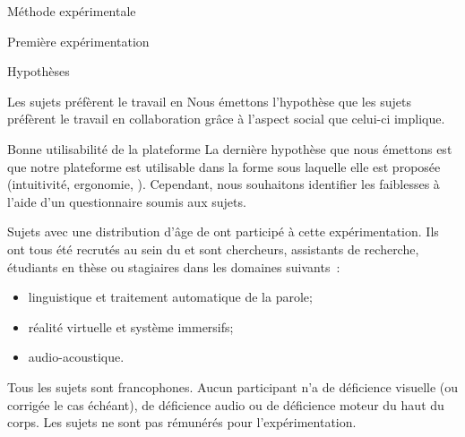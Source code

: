 \documentclass[myfrancais,ngerman,english,french]{mythesis}
\begin{document}
\begin{mychapter}{Méthode expérimentale}
\begin{mysection}{Première expérimentation}
\begin{mysubsection}{Hypothèses}
\begin{myparagraph}{ Les sujets préfèrent le travail en }
					Nous émettons l'hypothèse que les sujets préfèrent le travail en collaboration grâce à l'aspect social que celui-ci implique.
				\end{myparagraph}
				\begin{myparagraph}{ Bonne utilisabilité de la plateforme}
					La dernière hypothèse que nous émettons est que notre plateforme est utilisable dans la forme sous laquelle elle est proposée (intuitivité, ergonomie, \myetc).
					Cependant, nous souhaitons identifier les faiblesses à l'aide d'un questionnaire soumis aux sujets.
				\end{myparagraph}
			\end{mysubsection}
			\begin{mysubsection}{Sujets}
				 avec une distribution d'âge de  ont participé à cette expérimentation.
				Ils ont tous été recrutés au sein du  et sont chercheurs, assistants de recherche, étudiants en thèse ou stagiaires dans les domaines suivants~:
				\begin{itemize}
					\item linguistique et traitement automatique de la parole;
					\item réalité virtuelle et système immersifs;
					\item audio-acoustique.
				\end{itemize}

				Tous les sujets sont francophones.
				Aucun participant n'a de déficience visuelle (ou corrigée le cas échéant), de déficience audio ou de déficience moteur du haut du corps.
				Les sujets ne sont pas rémunérés pour l'expérimentation.


\end{mysubsection}
\end{mysection}
\end{mychapter}
\end{document}
